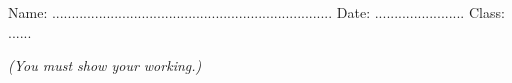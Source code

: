 \documentclass{article}
\date{}
\begin{document}
\fontsize{13}{15} \selectfont %

\begin{center}
  \qquad \\ 
\end{center} \\ 

Name: ........................................................................ \hspace{0.5cm}  Date: ....................... \hspace{0.5cm}  Class: ......

\par
\vspace*{10pt} 
\textit{(You must show your working.)  }
\vspace{10pt}



\end{document}
